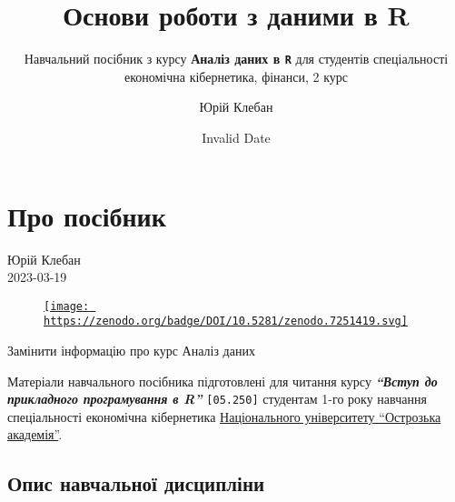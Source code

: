 \documentclass[
  letterpaper,
  DIV=11,
  numbers=noendperiod]{scrreprt}
\title{Основи роботи з даними в R}
\subtitle{Навчальний посібник з курсу \textbf{Аналіз даних в \texttt{R}}
для студентів спеціальності економічна кібернетика, фінанси, 2 курс}
\author{Юрій Клебан}
\date{Invalid Date}
\renewcommand*\contentsname{Зміст}
\newcommand\contentsname{Зміст}
\begin{document}
\maketitle
\ifdefined\Shaded\renewenvironment{Shaded}{\begin{tcolorbox}[enhanced, borderline west={3pt}{0pt}{shadecolor}, breakable, frame hidden, interior hidden, sharp corners, boxrule=0pt]}{\end{tcolorbox}}\fi

\renewcommand*\contentsname{Зміст}
{
\hypersetup{linkcolor=}
\setcounter{tocdepth}{2}
\tableofcontents
}

\hypertarget{ux43fux440ux43e-ux43fux43eux441ux456ux431ux43dux438ux43a}{%
\chapter*{Про
посібник}\label{ux43fux440ux43e-ux43fux43eux441ux456ux431ux43dux438ux43a}}

Юрій Клебан\\
2023-03-19

\hfill\break

\begin{figure}

{\centering 

\href{https://doi.org/10.5281/zenodo.7251419}{\texttt{[image: https://zenodo.org/badge/DOI/10.5281/zenodo.7251419.svg]}}

}

\end{figure}

Замінити інформацію про курс Аналіз даних

Матеріали навчального посібника підготовлені для читання курсу
\textbf{\emph{``Вступ до прикладного програмування в R''}}
\texttt{{[}05.250{]}} студентам 1-го року навчання спеціальності
економічна кібернетика \href{https://oa.edu.ua}{Національного
університету ``Острозька академія''}.

\hypertarget{ux43eux43fux438ux441-ux43dux430ux432ux447ux430ux43bux44cux43dux43eux457-ux434ux438ux441ux446ux438ux43fux43bux456ux43dux438}{%
\section*{Опис навчальної
дисципліни}\label{ux43eux43fux438ux441-ux43dux430ux432ux447ux430ux43bux44cux43dux43eux457-ux434ux438ux441ux446ux438ux43fux43bux456ux43dux438}}
\end{document}
